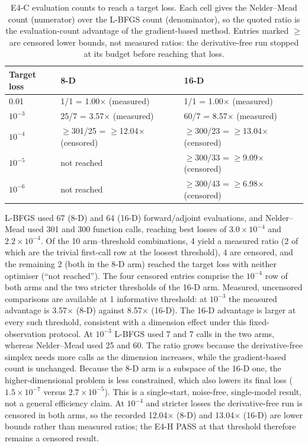 \documentclass[preprint,12pt]{elsarticle}
\begin{document}
\begin{table}[t]
\centering
\footnotesize
\caption{E4-C evaluation counts to reach a target loss. Each cell gives the
Nelder--Mead count (numerator) over the L-BFGS count (denominator), so the
quoted ratio is the evaluation-count advantage of the gradient-based method.
Entries marked $\ge$ are censored lower bounds, not measured ratios: the
derivative-free run stopped at its budget before reaching that loss.}
\label{tab:e4c}
\begin{tabular}{lp{5.0cm}p{5.0cm}}
\toprule
Target loss & 8-D & 16-D \\
\midrule
0.01 & 1/1 = 1.00$\times$ (measured) & 1/1 = 1.00$\times$ (measured) \\
$10^{-3}$ & 25/7 = 3.57$\times$ (measured) & 60/7 = 8.57$\times$ (measured) \\
$10^{-4}$ & $\ge$301/25 = $\ge$12.04$\times$ (censored) & $\ge$300/23 = $\ge$13.04$\times$ (censored) \\
$10^{-5}$ & not reached & $\ge$300/33 = $\ge$9.09$\times$ (censored) \\
$10^{-6}$ & not reached & $\ge$300/43 = $\ge$6.98$\times$ (censored) \\
\bottomrule
\end{tabular}
\end{table}

L-BFGS used 67 (8-D) and 64 (16-D)
forward/adjoint evaluations, and Nelder--Mead used 301 and 300
function calls, reaching best losses of $3.0\times10^{-4}$ and $2.2\times10^{-4}$.
Of the 10 arm--threshold combinations, 4
yield a measured ratio (2 of which are the trivial
first-call row at the loosest threshold), 4 are censored,
and the remaining 2 (both in the 8-D arm) reached the
target loss with neither optimiser (``not reached''). The four censored
entries comprise the $10^{-4}$ row of both arms and the two stricter
thresholds of the 16-D arm.
Measured, uncensored comparisons are available at 1 informative threshold: at $10^{-3}$ the measured advantage is 3.57$\times$ (8-D) against 8.57$\times$ (16-D). The 16-D advantage is larger at every such threshold, consistent with a dimension effect under this fixed-observation protocol. At $10^{-3}$ L-BFGS used 7 and 7 calls in the two arms, whereas Nelder--Mead used 25 and 60. The ratio grows because the derivative-free simplex needs more calls as the dimension increases, while the gradient-based count is unchanged. Because the 8-D arm is a subspace of the 16-D one, the higher-dimensional problem is less constrained, which also lowers its final loss ($1.5\times10^{-7}$ versus $2.7\times10^{-5}$). This is a single-start, noise-free, single-model result, not a general efficiency claim. At $10^{-4}$ and stricter losses the derivative-free run is censored in both arms, so the recorded 12.04$\times$ (8-D) and 13.04$\times$ (16-D) are lower bounds rather than measured ratios; the E4-H PASS at that threshold therefore remains a censored result.
\end{document}
